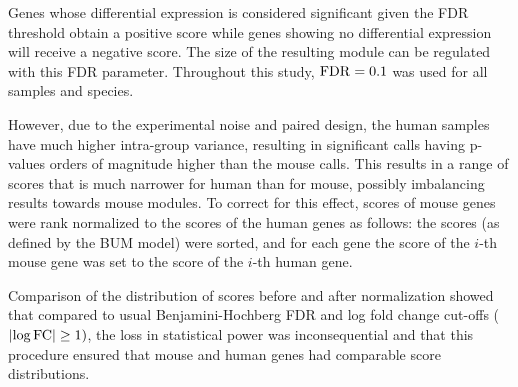 Genes whose differential expression is considered significant given the FDR threshold obtain a positive score while genes showing no differential expression will receive a negative score. %
The size of the resulting module can be regulated with this FDR parameter.
Throughout this study, $\mathrm{FDR}=0.1$ was used for all samples and species.

However, due to the experimental noise and paired design, the human samples have much higher intra-group variance, resulting in significant calls having p-values orders of magnitude higher than the mouse calls.
This results in a range of scores that is much narrower for human than for mouse, possibly imbalancing results towards mouse modules.
To correct for this effect, scores of mouse genes were rank normalized to the scores of the human genes as follows: the scores (as defined by the BUM model) were sorted, and for each gene the score of the $i$-th mouse gene was set to the score of the $i$-th human gene.

Comparison of the distribution of scores before and after normalization showed that compared to usual Benjamini-Hochberg FDR and log fold change cut-offs ($\lvert\log \mathrm{FC}\rvert \geq 1)$, the loss in statistical power was inconsequential and that this procedure ensured that mouse and human genes had comparable score distributions.



